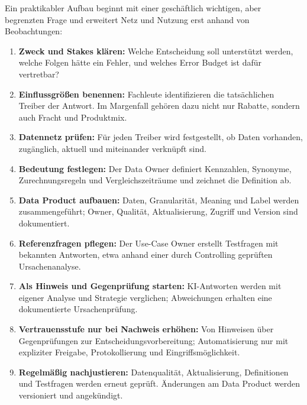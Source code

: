 \documentclass[a4paper,12pt,twoside]{report}
\theoremstyle{definition}
\begin{document}
Ein praktikabler Aufbau beginnt mit einer geschäftlich wichtigen, aber begrenzten Frage und erweitert Netz und Nutzung erst anhand von Beobachtungen:
\begin{enumerate}
\item \textbf{Zweck und Stakes klären:} Welche Entscheidung soll unterstützt werden, welche Folgen hätte ein Fehler, und welches Error Budget ist dafür vertretbar?
\item \textbf{Einflussgrößen benennen:} Fachleute identifizieren die tatsächlichen Treiber der Antwort. Im Margenfall gehören dazu nicht nur Rabatte, sondern auch Fracht und Produktmix.
\item \textbf{Datennetz prüfen:} Für jeden Treiber wird festgestellt, ob Daten vorhanden, zugänglich, aktuell und miteinander verknüpft sind.
\item \textbf{Bedeutung festlegen:} Der Data Owner definiert Kennzahlen, Synonyme, Zurechnungsregeln und Vergleichszeiträume und zeichnet die Definition ab.
\item \textbf{Data Product aufbauen:} Daten, Granularität, Meaning und Label werden zusammengeführt; Owner, Qualität, Aktualisierung, Zugriff und Version sind dokumentiert.
\item \textbf{Referenzfragen pflegen:} Der Use-Case Owner erstellt Testfragen mit bekannten Antworten, etwa anhand einer durch Controlling geprüften Ursachenanalyse.
\item \textbf{Als Hinweis und Gegenprüfung starten:} KI-Antworten werden mit eigener Analyse und Strategie verglichen; Abweichungen erhalten eine dokumentierte Ursachenprüfung.
\item \textbf{Vertrauensstufe nur bei Nachweis erhöhen:} Von Hinweisen über Gegenprüfungen zur Entscheidungsvorbereitung; Automatisierung nur mit expliziter Freigabe, Protokollierung und Eingriffsmöglichkeit.
\item \textbf{Regelmäßig nachjustieren:} Datenqualität, Aktualisierung, Definitionen und Testfragen werden erneut geprüft. Änderungen am Data Product werden versioniert und angekündigt.
\end{enumerate}
\end{document}
